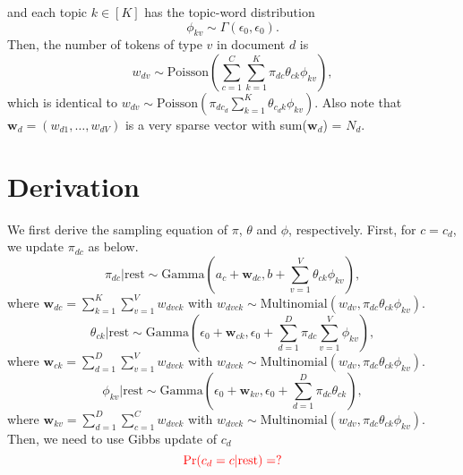 \documentclass[11pt]{article}
\begin{document}
and each topic $k\in[K]$ has the topic-word distribution
\begin{equation}
\phi_{kv} \sim  \Gamma(\epsilon_0,\epsilon_0).
\end{equation}
Then, the number of tokens of type $v$ in document $d$ is
\begin{equation}
w_{dv} \sim \mbox{Poisson}(\sum_{c=1}^C \sum_{k=1}^K \pi_{dc}\theta_{ck}\phi_{kv}),
\end{equation}
which is identical to $w_{dv} \sim \mbox{Poisson}(\pi_{dc_d}\sum_{k=1}^K \theta_{c_dk}\phi_{kv})$. Also note that $\boldsymbol{w}_d = (w_{d1},\ldots,w_{dV})$ is a very sparse vector with sum($\boldsymbol{w}_d$) = $N_d$. 

\section{Derivation}
We first derive the sampling equation of $\pi$, $\theta$ and $\phi$, respectively. 
First, for $c = c_d$, we update $\pi_{dc}$ as below.
\begin{equation}
\pi_{dc}| \mbox{rest} \sim \mbox{Gamma}(a_c + \boldsymbol{w}_{dc}, b + \sum_{v=1}^V\theta_{ck}\phi_{kv}),
\end{equation} 
where $\boldsymbol{w}_{dc} = \sum_{k=1}^K\sum_{v=1}^V w_{dvck}$ with $w_{dvck} \sim \mbox{Multinomial}(w_{dv}, \pi_{dc}\theta_{ck}\phi_{kv})$.
\begin{equation}
\theta_{ck}| \mbox{rest} \sim \mbox{Gamma}(\epsilon_0 + \boldsymbol{w}_{ck}, \epsilon_0 + \sum_{d=1}^D\pi_{dc}\sum_{v=1}^V\phi_{kv}),
\end{equation} 
where $\boldsymbol{w}_{ck} = \sum_{d=1}^D\sum_{v=1}^V w_{dvck}$ with $w_{dvck} \sim \mbox{Multinomial}(w_{dv}, \pi_{dc}\theta_{ck}\phi_{kv})$.
\begin{equation}
\phi_{kv}| \mbox{rest} \sim \mbox{Gamma}(\epsilon_0 + \boldsymbol{w}_{kv}, \epsilon_0 +\sum_{d=1}^D\pi_{dc}\theta_{ck} ),
\end{equation} 
where $\boldsymbol{w}_{kv} = \sum_{d=1}^D \sum_{c=1}^C w_{dvck}$ with $w_{dvck} \sim \mbox{Multinomial}(w_{dv},\pi_{dc}\theta_{ck}\phi_{kv})$.\\ \newline
Then, we need to use Gibbs update of $c_d$
\begin{equation}
\textcolor{red}{\Pr(c_d = c| \mbox{rest}) = ?}
\end{equation} 
\end{document}
